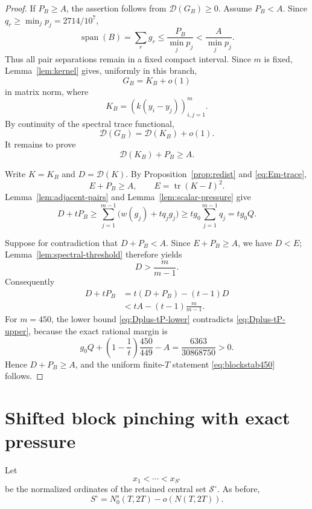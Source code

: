 \begin{proof}
If \(P_B\ge A\), the assertion follows from \(\mathcal D(G_B)\ge0\).
Assume \(P_B<A\).  Since \(q_r\ge\min_jp_j=2714/10^7\),
\[
 \operatorname{span}(B)
 =
 \sum_rg_r
 \le
 \frac{P_B}{\min_jp_j}
 <
 \frac{A}{\min_jp_j}.
\]
Thus all pair separations remain in a fixed compact interval.  Since \(m\) is
fixed, Lemma~\ref{lem:kernel} gives, uniformly in this branch,
\[
 G_B=K_B+o(1)
\]
in matrix norm, where
\[
 K_B=(k(y_i-y_j))_{i,j=1}^m.
\]
By continuity of the spectral trace functional,
\[
 \mathcal D(G_B)=\mathcal D(K_B)+o(1).
\]
It remains to prove
\[
 \mathcal D(K_B)+P_B\ge A.
\]

Write \(K=K_B\) and \(D=\mathcal D(K)\).  By
Proposition~\ref{prop:redist} and \eqref{eq:Em-trace},
\[
 E+P_B\ge A,
 \qquad
 E=\operatorname{tr}(K-I)^2.
\]
Lemma~\ref{lem:adjacent-pairs} and
Lemma~\ref{lem:scalar-pressure} give
\begin{equation}\label{eq:Dplus-tP-lower}
 D+tP_B
 \ge
 \sum_{j=1}^{m-1}\bigl(w(g_j)+tq_jg_j\bigr)
 \ge
 tg_0\sum_{j=1}^{m-1}q_j
 =
 tg_0Q.
\end{equation}

Suppose for contradiction that \(D+P_B<A\).  Since \(E+P_B\ge A\),
we have \(D<E\); Lemma~\ref{lem:spectral-threshold} therefore yields
\[
 D>\frac{m}{m-1}.
\]
Consequently
\begin{align}
 D+tP_B
 &=
 t(D+P_B)-(t-1)D \nonumber\\
 &<
 tA-(t-1)\frac{m}{m-1}.
 \label{eq:Dplus-tP-upper}
\end{align}
For \(m=450\), the lower bound
\eqref{eq:Dplus-tP-lower} contradicts
\eqref{eq:Dplus-tP-upper}, because the exact rational margin is
\begin{equation}\label{eq:contradiction-margin}
 g_0Q
 +
 \left(1-\frac1t\right)\frac{450}{449}
 -A
 =
 \frac{6363}{30868750}
 >0.
\end{equation}
Hence \(D+P_B\ge A\), and the uniform finite-\(T\) statement
\eqref{eq:blockstab450} follows.
\end{proof}


\section{Shifted block pinching with exact pressure}\label{sec:pinching}

Let
\[
 x_1<\cdots<x_{S^\circ}
\]
be the normalized ordinates of the retained central set
\(\mathcal S^\circ\).  As before,
\[
 S^\circ=N_0^s(T,2T)-o(N(T,2T)).
\]

